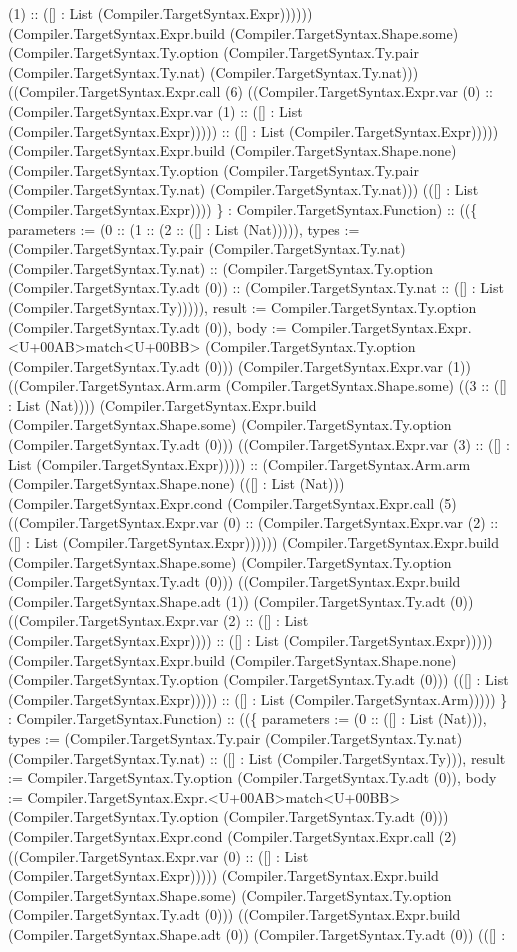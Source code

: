 \documentclass[11pt]{article}
\begin{document}
(1) :: ([] : List (Compiler.TargetSyntax.Expr)))))) (Compiler.TargetSyntax.Expr.build (Compiler.TargetSyntax.Shape.some) (Compiler.TargetSyntax.Ty.option (Compiler.TargetSyntax.Ty.pair (Compiler.TargetSyntax.Ty.nat) (Compiler.TargetSyntax.Ty.nat))) ((Compiler.TargetSyntax.Expr.call (6) ((Compiler.TargetSyntax.Expr.var (0) :: (Compiler.TargetSyntax.Expr.var (1) :: ([] : List (Compiler.TargetSyntax.Expr))))) :: ([] : List (Compiler.TargetSyntax.Expr))))) (Compiler.TargetSyntax.Expr.build (Compiler.TargetSyntax.Shape.none) (Compiler.TargetSyntax.Ty.option (Compiler.TargetSyntax.Ty.pair (Compiler.TargetSyntax.Ty.nat) (Compiler.TargetSyntax.Ty.nat))) (([] : List (Compiler.TargetSyntax.Expr)))) \} : Compiler.TargetSyntax.Function) :: ((\{ parameters := (0 :: (1 :: (2 :: ([] : List (Nat))))), types := (Compiler.TargetSyntax.Ty.pair (Compiler.TargetSyntax.Ty.nat) (Compiler.TargetSyntax.Ty.nat) :: (Compiler.TargetSyntax.Ty.option (Compiler.TargetSyntax.Ty.adt (0)) :: (Compiler.TargetSyntax.Ty.nat :: ([] : List (Compiler.TargetSyntax.Ty))))), result := Compiler.TargetSyntax.Ty.option (Compiler.TargetSyntax.Ty.adt (0)), body := Compiler.TargetSyntax.Expr.<U+00AB>match<U+00BB> (Compiler.TargetSyntax.Ty.option (Compiler.TargetSyntax.Ty.adt (0))) (Compiler.TargetSyntax.Expr.var (1)) ((Compiler.TargetSyntax.Arm.arm (Compiler.TargetSyntax.Shape.some) ((3 :: ([] : List (Nat)))) (Compiler.TargetSyntax.Expr.build (Compiler.TargetSyntax.Shape.some) (Compiler.TargetSyntax.Ty.option (Compiler.TargetSyntax.Ty.adt (0))) ((Compiler.TargetSyntax.Expr.var (3) :: ([] : List (Compiler.TargetSyntax.Expr))))) :: (Compiler.TargetSyntax.Arm.arm (Compiler.TargetSyntax.Shape.none) (([] : List (Nat))) (Compiler.TargetSyntax.Expr.cond (Compiler.TargetSyntax.Expr.call (5) ((Compiler.TargetSyntax.Expr.var (0) :: (Compiler.TargetSyntax.Expr.var (2) :: ([] : List (Compiler.TargetSyntax.Expr)))))) (Compiler.TargetSyntax.Expr.build (Compiler.TargetSyntax.Shape.some) (Compiler.TargetSyntax.Ty.option (Compiler.TargetSyntax.Ty.adt (0))) ((Compiler.TargetSyntax.Expr.build (Compiler.TargetSyntax.Shape.adt (1)) (Compiler.TargetSyntax.Ty.adt (0)) ((Compiler.TargetSyntax.Expr.var (2) :: ([] : List (Compiler.TargetSyntax.Expr)))) :: ([] : List (Compiler.TargetSyntax.Expr))))) (Compiler.TargetSyntax.Expr.build (Compiler.TargetSyntax.Shape.none) (Compiler.TargetSyntax.Ty.option (Compiler.TargetSyntax.Ty.adt (0))) (([] : List (Compiler.TargetSyntax.Expr))))) :: ([] : List (Compiler.TargetSyntax.Arm))))) \} : Compiler.TargetSyntax.Function) :: ((\{ parameters := (0 :: ([] : List (Nat))), types := (Compiler.TargetSyntax.Ty.pair (Compiler.TargetSyntax.Ty.nat) (Compiler.TargetSyntax.Ty.nat) :: ([] : List (Compiler.TargetSyntax.Ty))), result := Compiler.TargetSyntax.Ty.option (Compiler.TargetSyntax.Ty.adt (0)), body := Compiler.TargetSyntax.Expr.<U+00AB>match<U+00BB> (Compiler.TargetSyntax.Ty.option (Compiler.TargetSyntax.Ty.adt (0))) (Compiler.TargetSyntax.Expr.cond (Compiler.TargetSyntax.Expr.call (2) ((Compiler.TargetSyntax.Expr.var (0) :: ([] : List (Compiler.TargetSyntax.Expr))))) (Compiler.TargetSyntax.Expr.build (Compiler.TargetSyntax.Shape.some) (Compiler.TargetSyntax.Ty.option (Compiler.TargetSyntax.Ty.adt (0))) ((Compiler.TargetSyntax.Expr.build (Compiler.TargetSyntax.Shape.adt (0)) (Compiler.TargetSyntax.Ty.adt (0)) (([] : 
\end{document}
